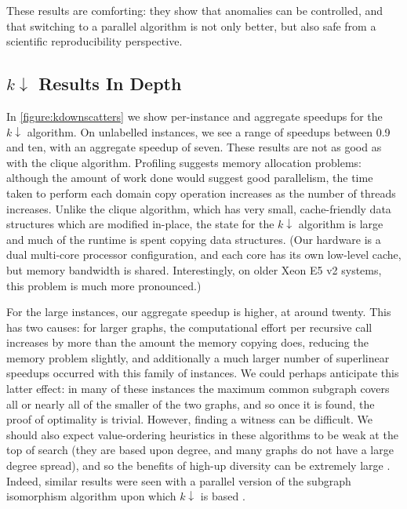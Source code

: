 \documentclass{llncs}
\begin{document}
These results are comforting: they show that anomalies can be controlled, and that
switching to a parallel algorithm is not only better, but also safe from a scientific
reproducibility perspective.

\subsection{$k{\downarrow}$ Results In Depth}

In \cref{figure:kdownscatters} we show per-instance and aggregate speedups for the $k{\downarrow}$
algorithm. On unlabelled instances, we see a range of speedups between 0.9 and ten, with an
aggregate speedup of seven. These results are not as good as with the clique algorithm.  Profiling
suggests memory allocation problems: although the amount of work done would suggest good
parallelism, the time taken to perform each domain copy operation increases as the number of threads
increases. Unlike the clique algorithm, which has very small, cache-friendly data structures which
are modified in-place, the state for the $k{\downarrow}$ algorithm is large and much of the runtime
is spent copying data structures. (Our hardware is a dual multi-core processor configuration, and
each core has its own low-level cache, but memory bandwidth is shared. Interestingly, on older Xeon
E5 v2 systems, this problem is much more pronounced.)

For the large instances, our aggregate speedup is higher, at around twenty. This has two causes: for
larger graphs, the computational effort per recursive call increases by more than the amount the
memory copying does, reducing the memory problem slightly, and additionally a much larger
number of superlinear speedups occurred with this family of instances. We could perhaps anticipate
this latter effect: in many of these instances the maximum common subgraph covers all or nearly all
of the smaller of the two graphs, and so once it is found, the proof of optimality is trivial.
However, finding a witness can be difficult. We should also expect value-ordering heuristics in
these algorithms to be weak at the top of search (they are based upon degree, and many graphs do not
have a large degree spread), and so the benefits of high-up diversity can be extremely large
\cite{DBLP:conf/ijcai/HarveyG95,DBLP:conf/cp/ChuSS09,DBLP:journals/topc/McCreeshP15}. Indeed,
similar results were seen with a parallel version of the subgraph isomorphism algorithm upon which
$k{\downarrow}$ is based \cite{DBLP:conf/cp/McCreeshP15}.
\end{document}
